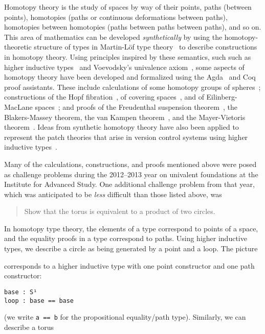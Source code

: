 

Homotopy theory is the study of spaces by way of their points, paths
(between points), homotopies (paths or continuous deformations between
paths), homotopies between homotopies (paths between paths between
paths), and so on.  This area of mathematics can be developed
\emph{synthetically} by using the homotopy-theoretic structure of types in
Martin-L\"of type
theory~\citep{hofmann98groupoid,lumsdaine09omega,vandenberggarner10groupoids,awodeywarren09identity,warren08thesis,gambinogarner08id,voevodsky11wollic}
to describe constructions in homotopy theory.  Using principles inspired
by these semantics, such such as higher inductive
types~\citep{lumsdaine+13hits,shulman11hitsblog,lumsdaine11hitsblog} and
Voevodsky's univalence
axiom~\citep{voevodsky11wollic,voevodsky+12simpluniv}, some aspects of
homotopy theory have been developed and formalized using the
Agda~\citep{norell07thesis} and Coq~\citep{inria06coqmanual} proof
assistants.  These include calculations of some homotopy groups of
spheres~\citep{ls13pi1s1,lb13pinsn,uf13hott-book}; constructions of the
Hopf fibration~\citep{uf13hott-book}, of covering
spaces~\citep{favonia-types}, and of Eilinberg-MacLane
spaces~\citep{lf14emspace}; and proofs of the Freudenthal suspension
theorem~\citep{uf13hott-book}, the Blakers-Massey theorem, the van
Kampen theorem~\citep{uf13hott-book}, and the Mayer-Vietoris
theorem~\citep{cavallo}.  Ideas from synthetic homotopy theory have also
been applied to represent the patch theories that arise in version
control systems using higher inductive types~\citep{amlh14patch}.

Many of the calculations, constructions, and proofs mentioned above were
posed as challenge problems during the 2012--2013 year on univalent
foundations at the Institute for Advanced Study.  One additional
challenge problem from that year, which was anticipated to be
\emph{less} difficult than those listed above, was
\begin{quote}
Show that the torus is equivalent to a product of two circles.
\end{quote}
In homotopy type theory, the elements of a type correspond to points of
a space, and the equality proofs in a type correspond to paths.  Using
higher inductive types, we describe a circle as being generated by a
point and a loop.  The picture
\begin{center}
\end{center}
corresponds to a higher inductive type with one point constructor and
one path constructor:
\begin{verbatim}
base : S¹
loop : base == base
\end{verbatim}
(we write \verb|a == b| for the propositional equality/path type).
Similarly, we can describe a torus

